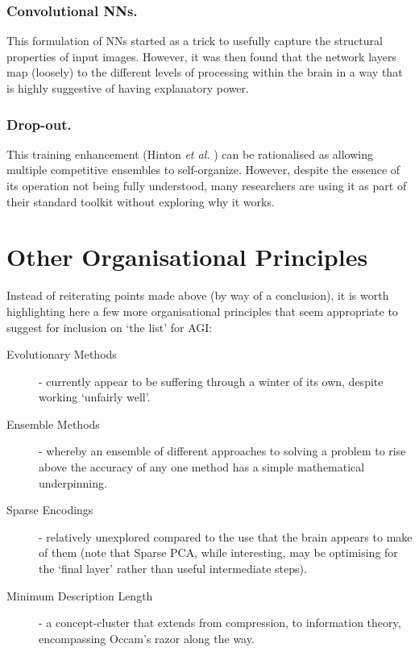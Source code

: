 \documentclass[citeauthoryear]{llncs}
\begin{document}
\subsubsection*{Convolutional NNs.}
This formulation of NNs started as a trick to usefully capture 
the structural properties of input images.  
However, it was then found that the network layers map (loosely) 
to the different levels of processing within the brain in a way that is highly suggestive 
of having explanatory power.

\subsubsection*{Drop-out.}
This training enhancement (Hinton \emph{et al.} \cite{hinton-dropout}) 
can be rationalised as allowing multiple competitive ensembles to self-organize.  
However, despite the essence of its operation not being fully understood, 
many researchers are using it as part of their standard toolkit without 
exploring why it works.


\section{Other Organisational Principles}

Instead of reiterating points made above (by way of a conclusion), 
it is worth highlighting here a few more organisational principles that 
seem appropriate to suggest for inclusion on `the list' for AGI:

\begin{description}
\item[Evolutionary Methods] - currently appear to be suffering through 
a winter of its own, despite working `unfairly well'.
\item[Ensemble Methods] - whereby an ensemble of different approaches to 
solving a problem to rise above the accuracy 
of any one method has a simple mathematical underpinning.  
\item[Sparse Encodings] - relatively unexplored compared to the use that 
the brain appears to make of them (note that Sparse PCA, while interesting, 
may be optimising for the `final layer' rather than useful intermediate steps).
\item[Minimum Description Length] - a concept-cluster that extends from compression, 
to information theory, encompassing Occam's razor along the way.
\end{description}

\end{document}

